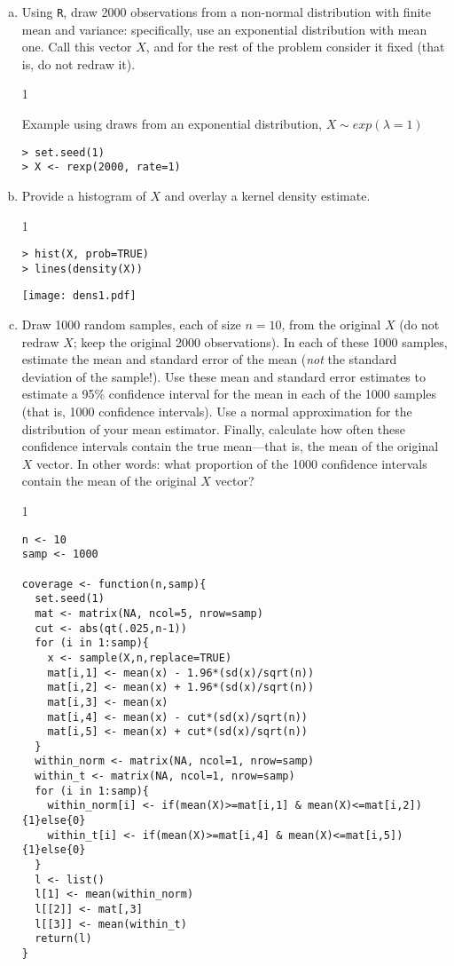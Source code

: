 \documentclass[12pt,letterpaper]{article}
\newcommand{\solutions}{0}
\begin{document}
\begin{enumerate}[(a)]
\item Using \texttt{R}, draw 2000 observations from a non-normal distribution with finite mean and variance: specifically, use an exponential distribution with mean one. Call this vector $X$, and for the rest of the problem consider it fixed (that is, do not redraw it).

\if\solutions1
{\color{red}
Example using draws from an exponential distribution, $X \sim exp(\lambda = 1)$

\begin{verbatim}
> set.seed(1)
> X <- rexp(2000, rate=1)
\end{verbatim}
}
\fi

\item Provide a histogram of $X$ and overlay a kernel density estimate.

\if\solutions1
{\color{red}
\begin{verbatim}
> hist(X, prob=TRUE)
> lines(density(X))
\end{verbatim}
}
\begin{center}
\vspace*{0cm}\hspace*{0cm}\texttt{[image: dens1.pdf]}
\end{center}
\fi

\item Draw 1000 random samples, each of size $n = 10$, from the original $X$ (do not redraw $X$; keep the original 2000 observations). In each of these 1000 samples, estimate the mean and standard error of the mean (\emph{not} the standard deviation of the sample!). Use these mean and standard error estimates to estimate a 95\% confidence interval for the mean in each of the 1000 samples (that is, 1000 confidence intervals). Use a normal approximation for the distribution of your mean estimator. Finally, calculate how often these confidence intervals contain the true mean---that is, the mean of the original $X$ vector. In other words: what proportion of the 1000 confidence intervals contain the mean of the original $X$ vector?

\if\solutions1
{\color{red}
\begin{verbatim}
n <- 10
samp <- 1000

coverage <- function(n,samp){
  set.seed(1)
  mat <- matrix(NA, ncol=5, nrow=samp)
  cut <- abs(qt(.025,n-1))
  for (i in 1:samp){
    x <- sample(X,n,replace=TRUE)
    mat[i,1] <- mean(x) - 1.96*(sd(x)/sqrt(n))
    mat[i,2] <- mean(x) + 1.96*(sd(x)/sqrt(n))
    mat[i,3] <- mean(x)
    mat[i,4] <- mean(x) - cut*(sd(x)/sqrt(n))
    mat[i,5] <- mean(x) + cut*(sd(x)/sqrt(n))
  }
  within_norm <- matrix(NA, ncol=1, nrow=samp)
  within_t <- matrix(NA, ncol=1, nrow=samp)
  for (i in 1:samp){
    within_norm[i] <- if(mean(X)>=mat[i,1] & mean(X)<=mat[i,2]){1}else{0}  
    within_t[i] <- if(mean(X)>=mat[i,4] & mean(X)<=mat[i,5]){1}else{0}  
  }
  l <- list()
  l[1] <- mean(within_norm)
  l[[2]] <- mat[,3]
  l[[3]] <- mean(within_t)
  return(l)
}


\end{verbatim}}
\end{enumerate}
\end{document}
